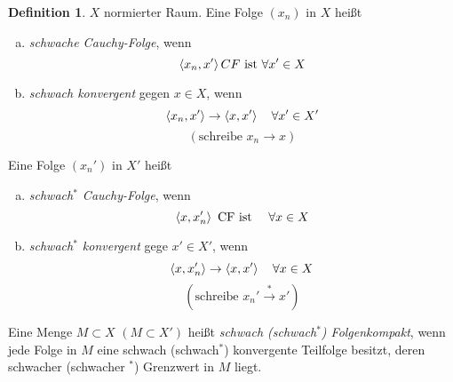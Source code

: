 \documentclass[ngerman]{report}
\theoremstyle{plain}%
\theoremstyle{definition}%
\newtheorem{definition}[thm]{Definition}
\theoremstyle{myStyle}
\begin{document}
	\begin{definition}
		$X$ normierter Raum. 
		Eine Folge $(x_n)$ in $X$ heißt 
			\begin{enumerate}[a)]
				\item \textit{schwache Cauchy-Folge}, wenn 
					$$ \left \langle x_n,x' \right \rangle CF \text{ ist }  \forall x' \in X$$
				\item \textit{schwach konvergent} gegen $x\in X$, wenn
					$$ \left \langle x_n, x' \right \rangle \to \left \langle x,x' \right \rangle \quad \forall x' \in X'$$
					$$(\text{schreibe } x_n \longrightarrow x )$$
			\end{enumerate}
		Eine Folge $(x_n')$ in $X'$ heißt
			\begin{enumerate}[a)]
				\item \textit{schwach$^*$ Cauchy-Folge}, wenn 
					$$ \left \langle x,x_n' \right \rangle \text{ CF ist } \quad \forall x\in X$$
				\item \textit{schwach$^*$ konvergent} gege $x' \in X'$, wenn
					$$ \left \langle x,x_n' \right \rangle \to \left \langle x,x' \right \rangle \quad \forall x\in X $$
					$$(\text{schreibe } x_n' \overset{*}{\longrightarrow} x')$$
			\end{enumerate}
			Eine Menge $M\subset X$ $(M \subset X')$ heißt \textit{schwach (schwach$^*$) Folgenkompakt}, wenn jede Folge in $M$ eine schwach (schwach$^*$) konvergente Teilfolge besitzt, deren schwacher (schwacher $^*$) Grenzwert in $M$ liegt.
		

	\end{definition}
\end{document}
